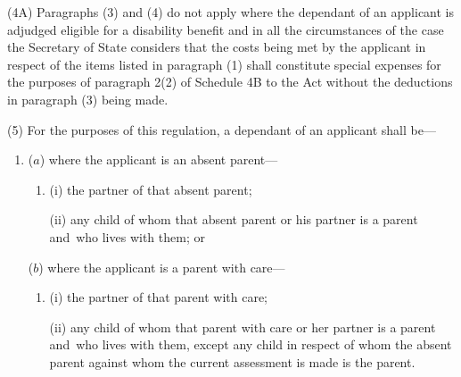 \documentclass[12pt,a4paper]{article}
\begin{document}

(4A) Paragraphs (3) and (4) do not apply where the dependant of an applicant is adjudged eligible for a disability benefit and in all the circumstances of the case the Secretary of State considers that the costs being met by the applicant in respect of the items listed in paragraph (1) shall constitute special expenses for the purposes of paragraph 2(2) of Schedule 4B to the Act without the deductions in paragraph (3) being made.

(5) For the purposes of this regulation, a dependant of an applicant shall be—
\begin{enumerate}\item[]
($a$) where the applicant is an absent parent—
\begin{enumerate}\item[]
(i) the partner of that absent parent;

(ii) any child of whom that absent parent or his partner is a parent and~who
lives with them; or
\end{enumerate}

($b$) where the applicant is a parent with care—
\begin{enumerate}\item[]
(i) the partner of that parent with care;

(ii) any child of whom that parent with care or her partner is a parent and~who
lives with them, except any child in respect of whom the absent parent against
whom the current assessment is made is the parent.
\end{enumerate}
\end{enumerate}
\end{document}

